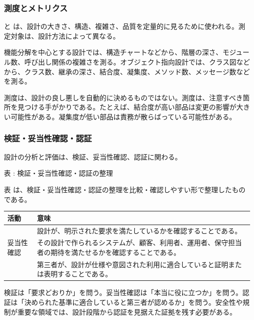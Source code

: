 \subsubsection{測度とメトリクス}

 と は、設計の大きさ、構造、複雑さ、品質を定量的に見るために使われる。測定対象は、設計方法によって異なる。

機能分解を中心とする設計では、構造チャートなどから、階層の深さ、モジュール数、呼び出し関係の複雑さを測る。オブジェクト指向設計では、クラス図などから、クラス数、継承の深さ、結合度、凝集度、メソッド数、メッセージ数などを測る。

測度は、設計の良し悪しを自動的に決めるものではない。測度は、注意すべき箇所を見つける手がかりである。たとえば、結合度が高い部品は変更の影響が大きい可能性がある。凝集度が低い部品は責務が散らばっている可能性がある。

\subsubsection{検証・妥当性確認・認証}

設計の分析と評価は、検証、妥当性確認、認証に関わる。

\par\smallskip\noindent{}\label{tab:ch03-07}表 \thetable: 検証・妥当性確認・認証の整理\par\smallskip
表 \thetable は、検証・妥当性確認・認証の整理を比較・確認しやすい形で整理したものである。\par\smallskip
\begin{tabularx}{\linewidth}{L{32mm}Y}
\toprule
活動 & 意味 \\
\midrule
{} & 設計が、明示された要求を満たしているかを確認することである。 \\
妥当性確認 & その設計で作られるシステムが、顧客、利用者、運用者、保守担当者の期待を満たせるかを確認することである。 \\
 & 第三者が、設計が仕様や意図された利用に適合していると証明または表明することである。 \\
\bottomrule
\end{tabularx}

検証は「要求どおりか」を問う。妥当性確認は「本当に役に立つか」を問う。認証は「決められた基準に適合していると第三者が認めるか」を問う。安全性や規制が重要な領域では、設計段階から認証を見据えた証拠を残す必要がある。
